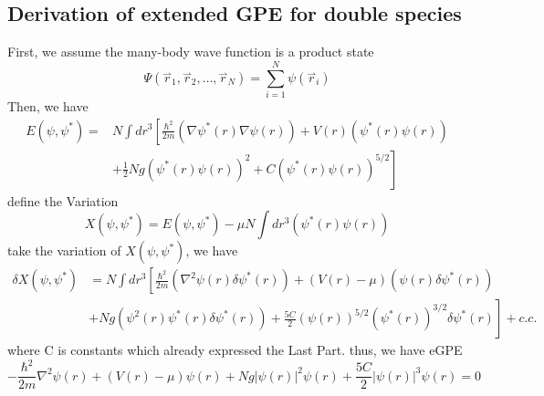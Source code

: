 \subsection{Derivation of extended GPE for double species}
First, we assume the many-body wave function is a product state
\begin{equation}
\Psi \left(\overset{\rightharpoonup }{r}_1,\overset{\rightharpoonup }{r}_2,\ldots  ,\overset{\rightharpoonup }{r}_N\right)=\sum _{i=1}^N \psi \left(\overset{\rightharpoonup
}{r}_i\right)
\end{equation}
Then, we have
\begin{equation}
\begin{split}
E\left(\psi ,\psi ^*\right)=&N\int dr^3\left[\frac{\hbar ^2}{2m}\left(\nabla \psi ^*(r)\nabla \psi (r)\right)+V(r)\left(\psi ^*(r)\psi (r)\right)\right.\\
&\left.+\frac{1}{2}N g\left(\psi ^*(r)\psi (r)\right)^2+C \left(\psi ^*(r)\psi (r)\right)^{5/2}\right]
\end{split}
\end{equation}
define the Variation
\begin{equation}
X\left(\psi ,\psi ^*\right)=E\left(\psi ,\psi ^*\right)-\mu  N\int dr^3\left(\psi ^*(r)\psi (r)\right)
\end{equation}
take the variation of $X\left(\psi ,\psi ^*\right)$, we have
\begin{equation}
\begin{split}
\delta  X\left(\psi ,\psi ^*\right)&=N\int dr^3\left[\frac{\hbar ^2}{2m}\left(\nabla ^2\psi (r)\delta \psi ^*(r)\right)+(V(r)-\mu )\left(\psi (r)\delta\psi ^*(r) \right)\right.\\
&\left.+N g\left(\psi ^2(r)\psi ^*(r)\delta \psi ^*(r)\right)+\frac{5C}{2}(\psi (r))^{5/2}\left(\psi ^*(r)\right)^{3/2}\delta \psi ^*(r)\right]+c.c.
\end{split}
\end{equation}
where C is constants which already expressed the Last Part.
thus, we have eGPE
\begin{equation}
-\frac{\hbar ^2}{2m}\nabla ^2\psi (r)+(V(r)-\mu )\psi (r)+N g\left|\psi (r)\right|^2\psi(r)+\frac{5C}{2}\left|\psi (r)\right|^3\psi (r)=0
\end{equation}

